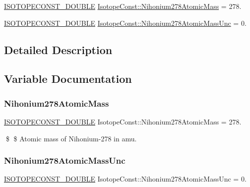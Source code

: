 \begin{DoxyCompactItemize}
\item 
\mbox{\hyperlink{group___isotope_const-_macros_ga8f45a7272ce02c0b4c65c44636ed719a}{I\+S\+O\+T\+O\+P\+E\+C\+O\+N\+S\+T\+\_\+\+D\+O\+U\+B\+LE}} \mbox{\hyperlink{group___isotope_const-_nihonium-_nh278_gaca601a772303ec662fa55566aacf0bb0}{Isotope\+Const\+::\+Nihonium278\+Atomic\+Mass}} = 278.
\item 
\mbox{\hyperlink{group___isotope_const-_macros_ga8f45a7272ce02c0b4c65c44636ed719a}{I\+S\+O\+T\+O\+P\+E\+C\+O\+N\+S\+T\+\_\+\+D\+O\+U\+B\+LE}} \mbox{\hyperlink{group___isotope_const-_nihonium-_nh278_ga6de473e00b8255e4927e739e40363629}{Isotope\+Const\+::\+Nihonium278\+Atomic\+Mass\+Unc}} = 0.
\end{DoxyCompactItemize}


\subsection{Detailed Description}


\subsection{Variable Documentation}
\mbox{\label{group___isotope_const-_nihonium-_nh278_gaca601a772303ec662fa55566aacf0bb0}} 
\subsubsection{\texorpdfstring{Nihonium278\+Atomic\+Mass}{Nihonium278AtomicMass}}
{\footnotesize\ttfamily \mbox{\hyperlink{group___isotope_const-_macros_ga8f45a7272ce02c0b4c65c44636ed719a}{I\+S\+O\+T\+O\+P\+E\+C\+O\+N\+S\+T\+\_\+\+D\+O\+U\+B\+LE}} Isotope\+Const\+::\+Nihonium278\+Atomic\+Mass = 278.}

\$ \$ Atomic mass of Nihonium-\/278 in amu. \mbox{\label{group___isotope_const-_nihonium-_nh278_ga6de473e00b8255e4927e739e40363629}} 
\subsubsection{\texorpdfstring{Nihonium278\+Atomic\+Mass\+Unc}{Nihonium278AtomicMassUnc}}
{\footnotesize\ttfamily \mbox{\hyperlink{group___isotope_const-_macros_ga8f45a7272ce02c0b4c65c44636ed719a}{I\+S\+O\+T\+O\+P\+E\+C\+O\+N\+S\+T\+\_\+\+D\+O\+U\+B\+LE}} Isotope\+Const\+::\+Nihonium278\+Atomic\+Mass\+Unc = 0.}

